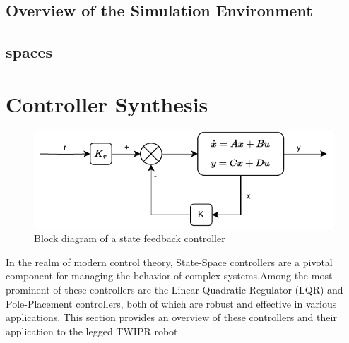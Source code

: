 \subsection{Overview of the Simulation Environment}
\subsection{spaces}

%
%

\section{Controller Synthesis}

\begin{figure}[h]
	\centering
	\includegraphics[width=.5\textwidth]{Block Diagram of State Feedback Controller}
	\caption{Block diagram of a state feedback controller}
	\label{fig:Block diagram of a state feedback controller}
\end{figure}


In the realm of modern control theory, State-Space controllers are a pivotal component for managing the behavior of complex systems.Among the most prominent of these controllers are the Linear Quadratic Regulator (LQR) and Pole-Placement controllers, both of which are robust and effective in various applications.
This section provides an overview of these controllers and their application to the legged TWIPR robot.

